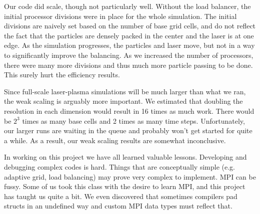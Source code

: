 \documentclass[]{article}
\begin{document}
Our code did scale, though not particularly well.  Without the load balancer, the initial processor divisions were in place for the whole simulation.  The initial divisions are naively set based on the number of base grid cells, and do not reflect the fact that the particles are densely packed in the center and the laser is at one edge.  As the simulation progresses, the particles and laser move, but not in a way to significantly improve the balancing.  As we increased the number of processors, there were many more divisions and thus much more particle passing to be done.  This surely hurt the efficiency results.

Since full-scale laser-plasma simulations will be much larger than what we ran, the weak scaling is arguably more important.  We estimated that doubling the resolution in each dimension would result in 16 times as much work.  There would be  $2^3$ times as many base cells and 2 times as many time steps.  Unfortunately, our larger runs are waiting in the queue and probably won't get started for quite a while.  As a result, our weak scaling results are somewhat inconclusive.

In working on this project we have all learned valuable lessons.  Developing and debugging complex codes is hard.  Things that are conceptually simple (e.g. adaptive grid, load balancing) may prove very complex to implement.  MPI can be fussy.  Some of us took this class with the desire to learn MPI, and this project has taught us quite a bit.  We even discovered that sometimes compilers pad structs in an undefined way and custom MPI data types must reflect that.
\end{document}
